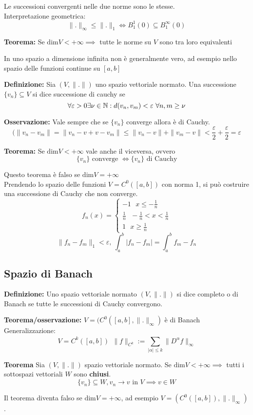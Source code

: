Le successioni convergenti nelle due norme sono le stesse.
\\Interpretazione geometrica:
\[\|.\|_\infty\le \|.\|_1\iff B_1^1(0)\subseteq  B_1^\infty(0)\]
\begin{tcolorbox}
	\textbf{Teorema:} Se $\text{dim}V<+\infty\implies$ tutte le norme su $V$ sono tra loro equivalenti
\end{tcolorbox}
In uno spazio a dimensione infinita non è generalmente vero, ad esempio nello spazio delle funzioni continue su $[a,b]$
\begin{tcolorbox}
	\textbf{Definizione:} Sia $(V,\|.\|)$ uno spazio vettoriale normato. Una successione $\{v_n\} \subseteq V$ si dice successione di cauchy se 
	\[\forall \varepsilon>0 \exists \nu\in\mathbb{N}:d(v_n,v_m)<\varepsilon\ \forall n,m\ge \nu\]
\end{tcolorbox}
\textbf{Osservazione:} Vale sempre che se $\{v_n\} $ converge allora è di Cauchy.
\[(\|v_n-v_m\|=\|v_n-v+v-v_m\|\le \|v_n-v\|+\|v_m-v\|<\frac{\varepsilon}{2}+\frac{\varepsilon}{2}=\varepsilon\]
\begin{tcolorbox}
	\textbf{Teorema:} Se $\text{dim}V<+\infty$ vale anche il viceversa, ovvero
	\[\{v_n\} \text{ converge }\iff \{v_n\} \text{ di Cauchy}\]
\end{tcolorbox}
Questo teorema è falso se $\text{dim}V=+\infty$
\\Prendendo lo spazio delle funzioni $V=C^0([a,b])$ con norma 1, si può costruire una successione di Cauchy che non converge.
\[f_n(x)=\begin{cases}
	-1\ \ \ x\le -\frac{1}{n}
	\\\frac{1}{n}\ \ \ -\frac{1}{n}<x<\frac{1}{n}
	\\1\ \ \ x\ge \frac{1}{n}
\end{cases}
\]
\[\|f_n-f_m\|_1<\varepsilon,\ \int_{a}^{b} |f_n-f_m|=\int_{a}^{b} f_m-f_n\]
\subsection{Spazio di Banach}
\begin{tcolorbox}
	\textbf{Definizione:} Uno spazio vettoriale normato $(V,\|.\|)$ si dice completo o di Banach se tutte le successioni di Cauchy convergono.
\end{tcolorbox}
\textbf{Teorema/osservazione: }$V=(C^0([a,b],\|.\|_\infty)$ è di Banach
\\Generalizzazione:
\[V=C^k([a,b])\ \ \|f\|_{C^k}:=\sum_{|\alpha|\le k}^{} \|D^\alpha f\|_\infty\]
\begin{tcolorbox}
	\textbf{Teorema} Sia $(V,\|.\|)$ spazio vettoriale normato. Se $\text{dim}V<+\infty\implies$ tutti i sottospazi vettoriali $W$ sono \textbf{chiusi}.
	\[\{v_n\} \subseteq  W,v_n\to v\text{ in }V\implies v\in W\]
\end{tcolorbox}
Il teorema diventa falso se $\text{dim}V=+\infty$, ad esempio $V=(C^0([a,b]), \|.\|_\infty)$.
